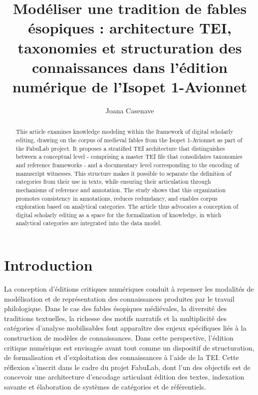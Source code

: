 \documentclass[final,fra]{anthology-ch}         %
\title{Modéliser une tradition de fables ésopiques : architecture TEI, taxonomies et structuration des connaissances dans l'édition numérique de l'Isopet 1-Avionnet}
\author[1]{Joana Casenave}[
  orcid=0000-0002-1609-1512,
  email=joana.casenave@univ-lille.fr
]
\affiliation{1}{Université de Lille, France}
\begin{document}
\maketitle

\begin{abstract}
This article examines knowledge modeling within the framework of digital scholarly editing, drawing on the corpus of medieval fables from the Isopet 1-Avionnet as part of the FabuLab project. It proposes a stratified TEI architecture that distinguishes between a conceptual level - comprising a master TEI file that consolidates taxonomies and reference frameworks - and a documentary level corresponding to the encoding of manuscript witnesses. This structure makes it possible to separate the definition of categories from their use in texts, while ensuring their articulation through mechanisms of reference and annotation. The study shows that this organization promotes consistency in annotations, reduces redundancy, and enables corpus exploration based on analytical categories. The article thus advocates a conception of digital scholarly editing as a space for the formalization of knowledge, in which analytical categories are integrated into the data model.
\end{abstract}


\section{Introduction}\label{introduction-1}

La conception d'éditions critiques numériques conduit à repenser les
modalités de modélisation et de représentation des connaissances
produites par le travail philologique.
Dans le cas des fables ésopiques
médiévales, la diversité des traditions textuelles, la richesse des
motifs narratifs et la multiplicité des catégories d'analyse
mobilisables font apparaître des enjeux spécifiques liés à la
construction de modèles de connaissances.
Dans cette perspective,
l'édition critique numérique est envisagée avant tout
comme un dispositif de structuration, de formalisation et d'exploitation
des connaissances à l'aide de la TEI.
Cette réflexion s'inscrit dans le
cadre du projet FabuLab, dont l'un des objectifs est de
concevoir une architecture d'encodage articulant édition des textes,
indexation savante et élaboration de systèmes de catégories et de
référentiels.
\end{document}
